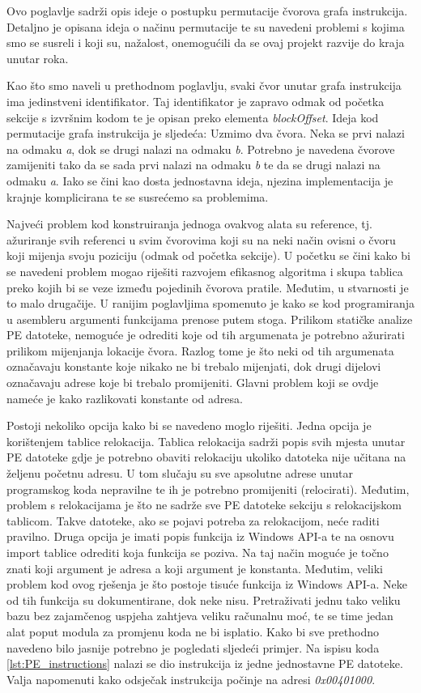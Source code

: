 \documentclass[times, utf8, diplomski, numeric]{fer}
\begin{document}
Ovo poglavlje sadrži opis ideje o postupku permutacije čvorova grafa
instrukcija. Detaljno je opisana ideja o načinu permutacije te su navedeni
problemi s kojima smo se susreli i koji su, nažalost, onemogućili da se ovaj
projekt razvije do kraja unutar roka.

Kao što smo naveli u prethodnom poglavlju, svaki čvor unutar grafa instrukcija
ima jedinstveni identifikator. Taj identifikator je zapravo odmak od početka
sekcije s izvršnim kodom te je opisan preko elementa \emph{blockOffset}. Ideja
kod permutacije grafa instrukcija je sljedeća: Uzmimo dva čvora. Neka se prvi
nalazi na odmaku \emph{a}, dok se drugi nalazi na odmaku \emph{b}. Potrebno je
navedena čvorove zamijeniti tako da se sada prvi nalazi na odmaku \emph{b} te
da se drugi nalazi na odmaku \emph{a}. Iako se čini kao dosta jednostavna
ideja, njezina implementacija je krajnje komplicirana te se susrećemo sa
problemima.

Najveći problem kod konstruiranja jednoga ovakvog alata su reference, tj.
ažuriranje svih referenci u svim čvorovima koji su na neki način ovisni o čvoru
koji mijenja svoju poziciju (odmak od početka sekcije). U početku se čini kako
bi se navedeni problem mogao riješiti razvojem efikasnog algoritma i skupa
tablica preko kojih bi se veze između pojedinih čvorova pratile. Međutim, u
stvarnosti je to malo drugačije. U ranijim poglavljima spomenuto je kako se kod
programiranja u asembleru argumenti funkcijama prenose putem stoga. Prilikom
statičke analize PE datoteke, nemoguće je odrediti koje od tih argumenata je
potrebno ažurirati prilikom mijenjanja lokacije čvora. Razlog tome je što neki
od tih argumenata označavaju konstante koje nikako ne bi trebalo mijenjati, dok
drugi dijelovi označavaju adrese koje bi trebalo promijeniti. Glavni problem
koji se ovdje nameće je kako razlikovati konstante od adresa. 

Postoji nekoliko opcija kako bi se navedeno moglo riješiti. Jedna opcija je
korištenjem tablice relokacija. Tablica relokacija sadrži popis svih mjesta
unutar PE datoteke gdje je potrebno obaviti relokaciju ukoliko datoteka nije
učitana na željenu početnu adresu. U tom slučaju su sve apsolutne adrese unutar
programskog koda nepravilne te ih je potrebno promijeniti (relocirati).
Međutim, problem s relokacijama je što ne sadrže sve PE datoteke sekciju
s relokacijskom tablicom. Takve datoteke, ako se pojavi potreba za
relokacijom, neće raditi pravilno. Druga opcija je imati popis funkcija iz
Windows API-a te na osnovu import tablice odrediti koja funkcija se poziva. Na
taj način moguće je točno znati koji argument je adresa a koji argument je
konstanta. Međutim, veliki problem kod ovog rješenja je što postoje tisuće
funkcija iz Windows API-a. Neke od tih funkcija su dokumentirane, dok neke
nisu. Pretraživati jednu tako veliku bazu bez zajamčenog uspjeha zahtjeva
veliku računalnu moć, te se time jedan alat poput modula za promjenu koda ne bi
isplatio. Kako bi sve prethodno navedeno bilo jasnije potrebno je pogledati
sljedeći primjer. Na ispisu koda \ref{lst:PE_instructions} nalazi se dio
instrukcija iz jedne jednostavne PE datoteke. Valja napomenuti kako odsječak 
instrukcija počinje na adresi \emph{0x00401000}.
\end{document}
